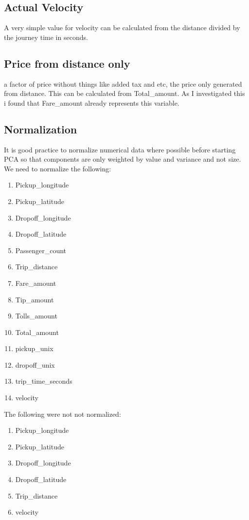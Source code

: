 \documentclass{article}
\begin{document}
\subsection{Actual Velocity}
A very simple value for velocity can be calculated from the distance divided by the journey time in seconds.

\subsection{Price from distance only}
a factor of price without things like added tax and etc, the price only generated from distance. This can be calculated from Total\_amount. As I investigated this i found that Fare\_amount already represents this variable.

\subsection{Normalization}
It is good practice to normalize numerical data where possible before starting PCA so that components are only weighted by value and variance and not size. We need to normalize the following:
\begin{enumerate}
\item Pickup\_longitude
\item Pickup\_latitude
\item Dropoff\_longitude
\item Dropoff\_latitude
\item Passenger\_count
\item Trip\_distance
\item Fare\_amount
\item Tip\_amount
\item Tolls\_amount
\item Total\_amount
\item pickup\_unix
\item dropoff\_unix
\item trip\_time\_seconds
\item velocity
\end{enumerate}
The following were not not normalized:
\begin{enumerate}
\item Pickup\_longitude
\item Pickup\_latitude
\item Dropoff\_longitude
\item Dropoff\_latitude
\item Trip\_distance
\item velocity
\end{enumerate}
\end{document}
